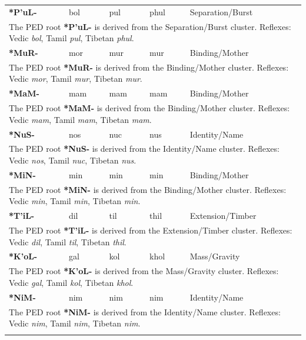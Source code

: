 \begin{longtable}{p{} p{} p{} p{} p{}}
\textbf{*P'uL-} & bol & pul & phul & Separation/Burst \\ 
\multicolumn{5}{p{\textwidth}}{\small The PED root \textbf{*P'uL-} is derived from the Separation/Burst cluster. Reflexes: Vedic \textit{bol}, Tamil \textit{pul}, Tibetan \textit{phul}. } \\ \addlinespace 
\textbf{*MuR-} & mor & mur & mur & Binding/Mother \\ 
\multicolumn{5}{p{\textwidth}}{\small The PED root \textbf{*MuR-} is derived from the Binding/Mother cluster. Reflexes: Vedic \textit{mor}, Tamil \textit{mur}, Tibetan \textit{mur}. } \\ \addlinespace 
\textbf{*MaM-} & mam & mam & mam & Binding/Mother \\ 
\multicolumn{5}{p{\textwidth}}{\small The PED root \textbf{*MaM-} is derived from the Binding/Mother cluster. Reflexes: Vedic \textit{mam}, Tamil \textit{mam}, Tibetan \textit{mam}. } \\ \addlinespace 
\textbf{*NuS-} & nos & nuc & nus & Identity/Name \\ 
\multicolumn{5}{p{\textwidth}}{\small The PED root \textbf{*NuS-} is derived from the Identity/Name cluster. Reflexes: Vedic \textit{nos}, Tamil \textit{nuc}, Tibetan \textit{nus}. } \\ \addlinespace 
\textbf{*MiN-} & min & min & min & Binding/Mother \\ 
\multicolumn{5}{p{\textwidth}}{\small The PED root \textbf{*MiN-} is derived from the Binding/Mother cluster. Reflexes: Vedic \textit{min}, Tamil \textit{min}, Tibetan \textit{min}. } \\ \addlinespace 
\textbf{*T'iL-} & dil & til & thil & Extension/Timber \\ 
\multicolumn{5}{p{\textwidth}}{\small The PED root \textbf{*T'iL-} is derived from the Extension/Timber cluster. Reflexes: Vedic \textit{dil}, Tamil \textit{til}, Tibetan \textit{thil}. } \\ \addlinespace 
\textbf{*K'oL-} & gal & kol & khol & Mass/Gravity \\ 
\multicolumn{5}{p{\textwidth}}{\small The PED root \textbf{*K'oL-} is derived from the Mass/Gravity cluster. Reflexes: Vedic \textit{gal}, Tamil \textit{kol}, Tibetan \textit{khol}. } \\ \addlinespace 
\textbf{*NiM-} & nim & nim & nim & Identity/Name \\ 
\multicolumn{5}{p{\textwidth}}{\small The PED root \textbf{*NiM-} is derived from the Identity/Name cluster. Reflexes: Vedic \textit{nim}, Tamil \textit{nim}, Tibetan \textit{nim}. } \\ \addlinespace 

\end{longtable}

